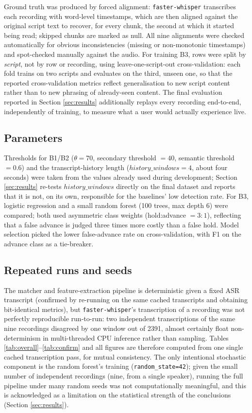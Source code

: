 \documentclass[conference,a4paper]{IEEEtran}
\begin{document}
Ground truth was produced by forced alignment: \texttt{faster-whisper} transcribes each recording with word-level timestamps, which are then aligned against the original script text to recover, for every chunk, the second at which it started being read; skipped chunks are marked as null. All nine alignments were checked automatically for obvious inconsistencies (missing or non-monotonic timestamps) and spot-checked manually against the audio. For training B3, rows were split by \emph{script}, not by row or recording, using leave-one-script-out cross-validation: each fold trains on two scripts and evaluates on the third, unseen one, so that the reported cross-validation metrics reflect generalisation to new script content rather than to new phrasing of already-seen content. The final evaluation reported in Section \ref{sec:results} additionally replays every recording end-to-end, independently of training, to measure what a user would actually experience live.

\subsection{Parameters}
Thresholds for B1/B2 (\(\theta=70\), secondary threshold \(=40\), semantic threshold \(=0.6\)) and the transcript-history length (\(history\_windows=4\), about four seconds) were taken from the values already used during development; Section \ref{sec:results} re-tests \(history\_windows\) directly on the final dataset and reports that it is not, on its own, responsible for the baselines' low detection rate. For B3, logistic regression and a small random forest (100 trees, max depth 6) were compared; both used asymmetric class weights (hold:advance \(=3:1\)), reflecting that a false advance is judged three times more costly than a false hold. Model selection picked the lower false-advance rate on cross-validation, with F1 on the advance class as a tie-breaker.

\subsection{Repeated runs and seeds}
The matcher and feature-extraction pipeline is deterministic given a fixed ASR transcript (confirmed by re-running on the same cached transcripts and obtaining bit-identical metrics), but \texttt{faster-whisper}'s transcription of a recording was not perfectly reproducible run-to-run: two independent transcriptions of the same nine recordings disagreed by one window out of 2391, almost certainly float non-determinism in multi-threaded CPU inference rather than sampling. Tables \ref{tab:overall}--\ref{tab:confirm} and all figures are therefore computed from one single cached transcription pass, for mutual consistency. The only intentional stochastic component is the random forest's training (\texttt{random\_state=42}); given the small number of independent recordings (nine, from a single speaker), running the full pipeline under many random seeds was not computationally meaningful, and this is acknowledged as a limitation on the statistical strength of the conclusions (Section \ref{sec:results}).
\end{document}
